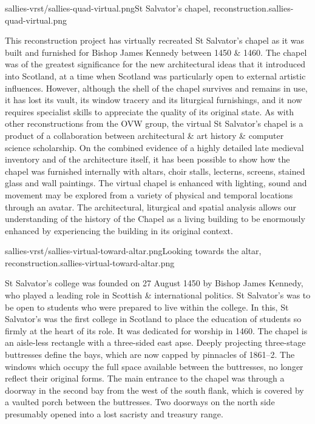        {sallies-vrst/sallies-quad-virtual.png}{St Salvator's chapel, reconstruction.}{sallies-quad-virtual.png}
       
This reconstruction project has virtually recreated St Salvator’s chapel as it was built and furnished for Bishop James Kennedy between 1450 \& 1460. The chapel was of the greatest significance for the new architectural ideas that it introduced into Scotland, at a time when Scotland was particularly open to external artistic influences. However, although the shell of the chapel survives and remains in use, it has lost its vault, its window tracery and its liturgical furnishings, and it now requires specialist skills to appreciate the quality of its original state. As with other reconstructions from the OVW group, the virtual St Salvator's chapel is a product of a collaboration between architectural \& art history \& computer science scholarship. On the combined evidence of a highly detailed late medieval inventory and of the architecture itself, it has been possible to show how the chapel was furnished internally with altars, choir stalls, lecterns, screens, stained glass and wall paintings. The virtual chapel is enhanced with lighting, sound and movement may be explored from a variety of physical and temporal locations through an avatar. The architectural, liturgical and spatial analysis allows our understanding of the history of the Chapel as a living building to be enormously enhanced by experiencing the building in its original context.

       {sallies-vrst/sallies-virtual-toward-altar.png}{Looking towards the altar, reconstruction.}{sallies-virtual-toward-altar.png}

St Salvator's college was founded on 27 August 1450 by Bishop James Kennedy, who played a leading role in Scottish \& international politics. St Salvator’s was to be open to students who were prepared to live within the college. In this, St Salvator’s was the first college in Scotland to place the education of students so firmly at the heart of its role. It was dedicated for worship in 1460. The chapel is an aisle-less rectangle with a three-sided east apse. Deeply projecting three-stage buttresses define the bays, which are now capped by pinnacles of 1861–2. The windows which occupy the full space available between the buttresses, no longer reflect their original forms. The main entrance to the chapel was through a doorway in the second bay from the west of the south flank, which is covered by a vaulted porch between the buttresses. Two doorways on the north side presumably opened into a lost sacristy and treasury range.

